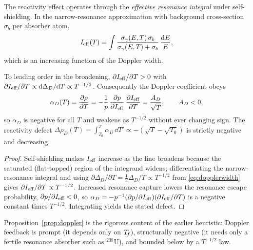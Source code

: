 The reactivity effect operates through the \emph{effective resonance integral}
under self-shielding. In the narrow-resonance approximation with background
cross-section $\sigma_b$ per absorber atom,
\begin{equation}
I_{\rm eff}(T)=\int \frac{\sigma_\gamma(E,T)\,\sigma_b}{\sigma_\gamma(E,T)+\sigma_b}\,
\frac{\mathrm{d} E}{E},
\end{equation}
which is an increasing function of the Doppler width.

\begin{proposition}
\label{prop:doppler}
To leading order in the broadening, $\partial I_{\rm eff}/\partial T>0$ with
$\partial I_{\rm eff}/\partial T\propto \mathrm{d}\Delta_D/\mathrm{d} T\propto T^{-1/2}$.
Consequently the Doppler coefficient obeys
\begin{equation}
\alpha_D(T)=\frac{\partial\rho}{\partial T}
 =-\frac{1}{p}\,\frac{\partial p}{\partial I_{\rm eff}}\,
   \frac{\partial I_{\rm eff}}{\partial T}
 =\frac{A_D}{\sqrt{T}},\qquad A_D<0,
\end{equation}
so $\alpha_D$ is negative for all $T$ and weakens as $T^{-1/2}$ without ever
changing sign. The reactivity defect $\Delta\rho_D(T)=\int_{T_0}^{T}\alpha_D\,\dd
T'\propto -(\sqrt T-\sqrt{T_0})$ is strictly negative and decreasing.
\end{proposition}
\begin{proof}
Self-shielding makes $I_{\rm eff}$ increase as the line broadens because the
saturated (flat-topped) region of the integrand widens; differentiating the
narrow-resonance integral and using $\partial\Delta_D/\partial T=\tfrac12
\Delta_D/T\propto T^{-1/2}$ from \eqref{eq:dopplerwidth} gives
$\partial I_{\rm eff}/\partial T\propto T^{-1/2}$. Increased resonance capture
lowers the resonance escape probability, $\partial p/\partial I_{\rm eff}<0$, so
$\alpha_D=-p^{-1}(\partial p/\partial I_{\rm eff})(\partial I_{\rm eff}/\partial
T)$ is a negative constant times $T^{-1/2}$. Integrating yields the stated defect.
\end{proof}

Proposition~\ref{prop:doppler} is the rigorous content of the earlier heuristic:
Doppler feedback is prompt (it depends only on $T_{\!f}$), structurally negative (it
needs only a fertile resonance absorber such as $^{238}$U), and bounded below by a
$T^{-1/2}$ law.


